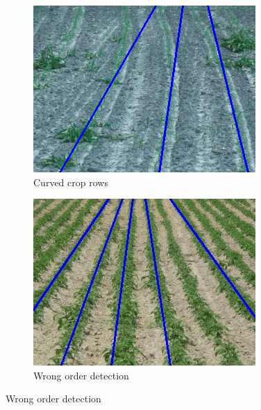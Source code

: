 \begin{figure}[H]
\centering
\begin{subfigure}
    {0.3\textwidth}
    \includegraphics[width=\textwidth]{Report/images/FailureCases/img annotated_ _screenshot_07.01.2023 (2).png}
    \caption{Curved crop rows}
    \label{fig:cropcurved}
\end{subfigure}
\begin{subfigure}{0.3\textwidth}%
    \includegraphics[width=\textwidth]{Report/images/ransaccropskipped.jpg}
    \caption{Wrong order detection}
    \label{fig:missedcrop}


\end{subfigure}
\end{figure}
